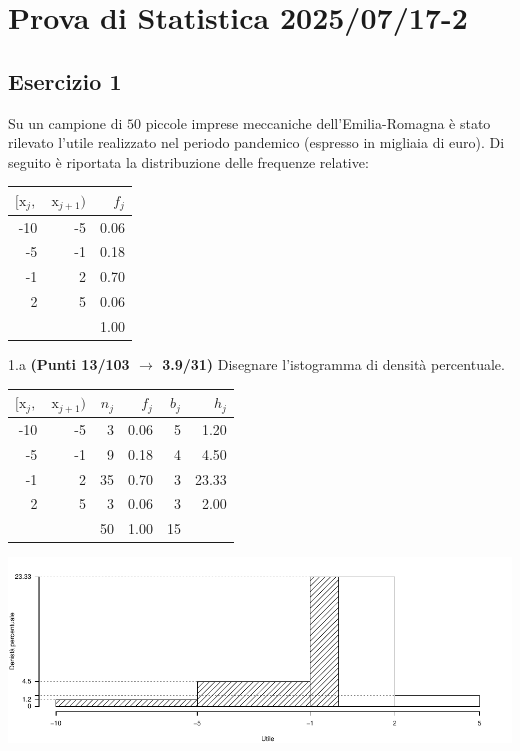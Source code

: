 \documentclass[
  11pt,
]{book}
\theoremstyle{mytheoremstyle}
\theoremstyle{mydefstyle}
\newenvironment{sol}
  {
  \begin{tcolorbox}[enhanced,breakable,arc=0.1mm,boxrule=1pt,colback=white,colframe=iblue,
  title=\bf \fontfamily{lmss}\selectfont \hspace{.5 cm} Soluzione,drop fuzzy shadow]

}{
\end{tcolorbox}
  }
\begin{document}
\section{Prova di Statistica 2025/07/17-2}\label{prova-di-statistica-20250717-2}

\subsection{Esercizio 1}\label{esercizio-1-50}

Su un campione di \(50\) piccole imprese meccaniche dell'Emilia-Romagna è stato rilevato l'utile
realizzato nel periodo pandemico (espresso in migliaia di euro).
Di seguito è riportata la distribuzione delle frequenze relative:

\begin{table}[H]
\centering
\begin{tabular}{rrr}
\toprule
$[\text{x}_j,$ & $\text{x}_{j+1})$ & $f_j$\\
\midrule
-10 & -5 & 0.06\\
-5 & -1 & 0.18\\
-1 & 2 & 0.70\\
2 & 5 & 0.06\\
 &  & 1.00\\
\bottomrule
\end{tabular}
\end{table}

1.a \textbf{(Punti 13/103 \(\rightarrow\) 3.9/31)} Disegnare l'istogramma di densità percentuale.

\begin{sol}

\begin{table}[H]
\centering
\begin{tabular}{rrrrrr}
\toprule
$[\text{x}_j,$ & $\text{x}_{j+1})$ & $n_j$ & $f_j$ & $b_j$ & $h_j$\\
\midrule
-10 & -5 & 3 & 0.06 & 5 & 1.20\\
-5 & -1 & 9 & 0.18 & 4 & 4.50\\
-1 & 2 & 35 & 0.70 & 3 & 23.33\\
2 & 5 & 3 & 0.06 & 3 & 2.00\\
 &  & 50 & 1.00 & 15 & \\
\bottomrule
\end{tabular}
\end{table}

\begin{center}\includegraphics{Esami_passati_con_soluzioni_files/figure-latex/2.1a-1} \end{center}

\end{sol}
\end{document}
